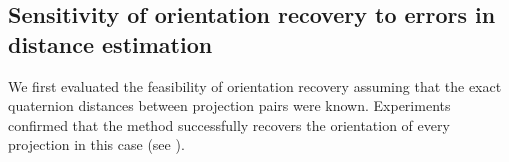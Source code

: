 

\subsection{Sensitivity of orientation recovery to errors in distance estimation}\label{sec:results:orientation-recovery:sensitivity}



We first evaluated the feasibility of orientation recovery assuming that the exact quaternion distances between projection pairs were known.
Experiments confirmed that the method successfully recovers the orientation of every projection in this case (see ).

